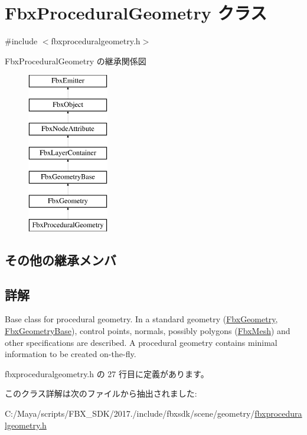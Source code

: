 \hypertarget{class_fbx_procedural_geometry}{}\section{Fbx\+Procedural\+Geometry クラス}
\label{class_fbx_procedural_geometry}


{\ttfamily \#include $<$fbxproceduralgeometry.\+h$>$}

Fbx\+Procedural\+Geometry の継承関係図\begin{figure}[H]
\begin{center}
\leavevmode
\includegraphics[height=7.000000cm]{class_fbx_procedural_geometry}
\end{center}
\end{figure}
\subsection*{その他の継承メンバ}


\subsection{詳解}
Base class for procedural geometry. In a standard geometry (\hyperlink{class_fbx_geometry}{Fbx\+Geometry}, \hyperlink{class_fbx_geometry_base}{Fbx\+Geometry\+Base}), control points, normals, possibly polygons (\hyperlink{class_fbx_mesh}{Fbx\+Mesh}) and other specifications are described. A procedural geometry contains minimal information to be created on-\/the-\/fly. 

 fbxproceduralgeometry.\+h の 27 行目に定義があります。



このクラス詳解は次のファイルから抽出されました\+:\begin{DoxyCompactItemize}
\item 
C\+:/\+Maya/scripts/\+F\+B\+X\+\_\+\+S\+D\+K/2017./include/fbxsdk/scene/geometry/\hyperlink{fbxproceduralgeometry_8h}{fbxproceduralgeometry.\+h}\end{DoxyCompactItemize}
